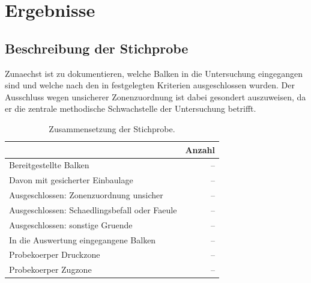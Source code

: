 \chapter{Ergebnisse}
\label{ch:results}

\begin{center}
\end{center}

\section{Beschreibung der Stichprobe}
\label{sec:descriptives}

Zunaechst ist zu dokumentieren, welche Balken in die Untersuchung eingegangen
sind und welche nach den in  festgelegten Kriterien
ausgeschlossen wurden. Der Ausschluss wegen unsicherer Zonenzuordnung ist
dabei gesondert auszuweisen, da er die zentrale methodische Schwachstelle der
Untersuchung betrifft.

\begin{table}[H]
\centering
\caption{Zusammensetzung der Stichprobe.}
\label{tab:sample}
\begin{tabular}{@{}lr@{}}
\toprule
& \textbf{Anzahl} \\
\midrule
Bereitgestellte Balken                        & -- \\
Davon mit gesicherter Einbaulage              & -- \\
Ausgeschlossen: Zonenzuordnung unsicher       & -- \\
Ausgeschlossen: Schaedlingsbefall oder Faeule & -- \\
Ausgeschlossen: sonstige Gruende              & -- \\
\midrule
In die Auswertung eingegangene Balken         & -- \\
Probekoerper Druckzone                        & -- \\
Probekoerper Zugzone                          & -- \\
\bottomrule
\end{tabular}
\end{table}

